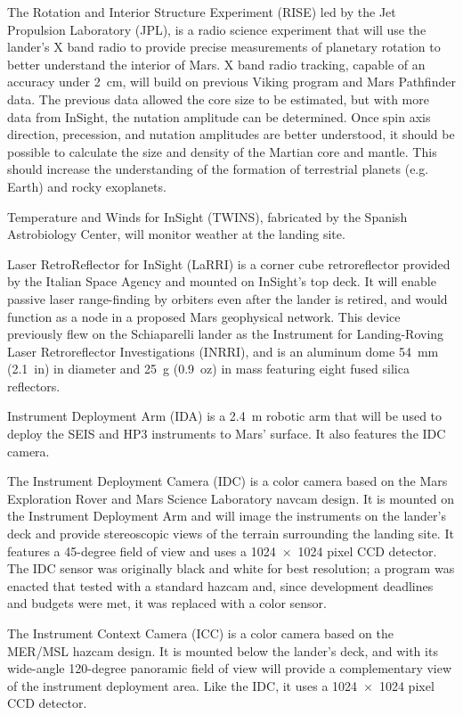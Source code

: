 The Rotation and Interior Structure Experiment (RISE) led by the Jet
Propulsion Laboratory (JPL), is a radio science experiment that will use
the lander's X band radio to provide precise measurements of planetary
rotation to better understand the interior of Mars. X band radio
tracking, capable of an accuracy under 2~cm, will build on previous
Viking program and Mars Pathfinder data. The previous data allowed the
core size to be estimated, but with more data from InSight, the nutation
amplitude can be determined. Once spin axis direction, precession, and
nutation amplitudes are better understood, it should be possible to
calculate the size and density of the Martian core and mantle. This
should increase the understanding of the formation of terrestrial
planets (e.g. Earth) and rocky exoplanets.

Temperature and Winds for InSight (TWINS), fabricated by the Spanish
Astrobiology Center, will monitor weather at the landing site.

Laser RetroReflector for InSight (LaRRI) is a corner cube retroreflector
provided by the Italian Space Agency and mounted on InSight's top deck.
It will enable passive laser range-finding by orbiters even after the
lander is retired, and would function as a node in a proposed Mars
geophysical network. This device previously flew on the Schiaparelli
lander as the Instrument for Landing-Roving Laser Retroreflector
Investigations (INRRI), and is an aluminum dome 54~mm (2.1~in) in
diameter and 25~g (0.9~oz) in mass featuring eight fused silica
reflectors.

Instrument Deployment Arm (IDA) is a 2.4~m robotic arm that will be used
to deploy the SEIS and HP3 instruments to Mars' surface. It also
features the IDC camera.

The Instrument Deployment Camera (IDC) is a color camera based on the
Mars Exploration Rover and Mars Science Laboratory navcam design. It is
mounted on the Instrument Deployment Arm and will image the instruments
on the lander's deck and provide stereoscopic views of the terrain
surrounding the landing site. It features a 45-degree field of view and
uses a 1024~×~1024 pixel CCD detector. The IDC sensor was originally
black and white for best resolution; a program was enacted that tested
with a standard hazcam and, since development deadlines and budgets were
met, it was replaced with a color sensor.

The Instrument Context Camera (ICC) is a color camera based on the
MER/MSL hazcam design. It is mounted below the lander's deck, and with
its wide-angle 120-degree panoramic field of view will provide a
complementary view of the instrument deployment area. Like the IDC, it
uses a 1024~×~1024 pixel CCD detector.

